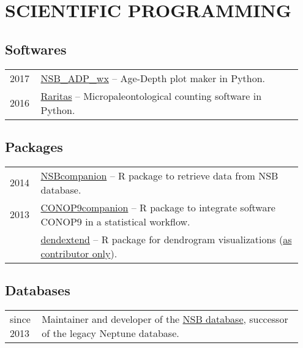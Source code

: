 \documentclass[11pt, a4paper]{article}
\begin{document}
\section{SCIENTIFIC PROGRAMMING}
\subsection{Softwares}
\begin{longtable}{p{0.1\linewidth} P{0.85\linewidth}}
2017 & \href{http://github.com/plannapus/NSB_ADP_wx/releases}{NSB\_ADP\_wx} -- Age-Depth plot maker in Python.\\
2016 & \href{http://github.com/plannapus/Raritas/releases}{Raritas} -- Micropaleontological counting software in Python.\\
\end{longtable}
\subsection{Packages}
\begin{longtable}{p{0.1\linewidth} P{0.85\linewidth}}
2014 & \href{http://github.com/plannapus/NSB}{NSBcompanion} -- R package to retrieve data from NSB database.\\
2013 & \href{http://github.com/plannapus/CONOP9companion}{CONOP9companion} -- R package to integrate software CONOP9 in a statistical workflow.\\
     & \href{https://cran.r-project.org/web/packages/dendextend/index.html}{dendextend} -- R package for dendrogram visualizations (\underline{as contributor only}).\\
\end{longtable}
\subsection{Databases}
\begin{longtable}{p{0.1\linewidth} P{0.85\linewidth}}
since 2013 & Maintainer and developer of the \href{http://nsb-mfn-berlin.de/}{NSB database}, successor of the legacy Neptune database.\\
\end{longtable}
\end{document}
